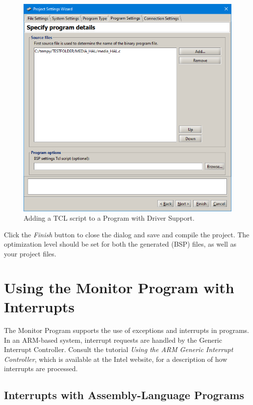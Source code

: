 \documentclass[11pt, twoside, pdftex]{article}
\begin{document}
\begin{figure}[H]
   \begin{center}
      \includegraphics[scale=0.6]{screenshots/tclScript.png}
   \end{center}
   \caption{Adding a TCL script to a Program with Driver Support.}
	 \label{fig:tclScript}
\end{figure}

Click the {\it Finish} button to close the dialog and save and compile the project. The optimization level should be set for both the generated (BSP) files, as well as your project files.


\section{Using the Monitor Program with Interrupts}
\label{sec:7}
\label{sec:7}

The Monitor Program supports the use of exceptions and interrupts
in programs. In an ARM-based system, interrupt requests are handled by the Generic Interrupt Controller. Consult the tutorial
{\it Using the ARM Generic Interrupt Controller}, which is
available at the Intel website, for a description of how
interrupts are processed.

\subsection{Interrupts with Assembly-Language Programs}
\label{sec:7.1}
\end{document}
